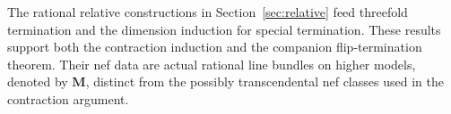 The rational relative constructions in Section~\ref{sec:relative}
feed threefold termination and the dimension induction for special
termination. These results support both the contraction induction and
the companion flip-termination theorem. Their nef data are actual rational
line bundles on higher models, denoted by $\mathbf M$, distinct from the
possibly transcendental nef classes used in the contraction argument.


